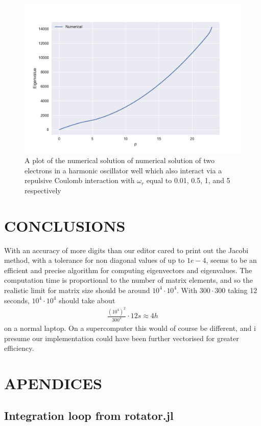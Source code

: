 \documentclass[a4paper]{article}
\begin{document}
\begin{figure}[h!]
\includegraphics[scale=0.45]{../oppe_rho-23n-400l0-186125.pdf}
\caption{A plot of the numerical solution of numerical solution of two electrons in a harmonic oscillator well which also interact via a repulsive Coulomb interaction with $\omega_r$ equal to 0.01, 0.5, 1, and 5 respectively}
\label{opp e res}
\end{figure}


\section{CONCLUSIONS}
With an accuracy of more digits than our editor cared to print out the Jacobi method, with a tolerance for non diagonal values of up to $1e-4$, seems to be an efficient and precise algorithm for computing eigenvectors and eigenvalues. The computation time is proportional to the number of matrix elements, and so the realistic limit for matrix size should be around $10^4 \cdot 10^4$. With $300 \cdot 300$ taking 12 seconds, $10^4 \cdot 10^4$ should take about
\begin{align}
\frac{(10^4)^2}{300^2}\cdot 12s\approx 4h
\end{align}
on a normal laptop. On a supercomputer this would of course be different, and i presume our implementation could have been further vectorised for greater efficiency.



\section{APENDICES}
\subsection{Integration loop from rotator.jl}\label{rotator.jl}

\end{document}
